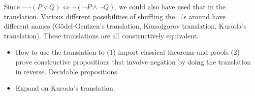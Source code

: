 \documentclass[a4paper, 11pt]{article}
\theoremstyle{definition}
\newcommand{\nn}{\neg \neg}
\begin{document}
Since $\nn (P \vee Q) \iff \neg (\neg P \wedge \neg Q)$, we could also have used that in the translation. Various different possibilities of shuffling the $\neg$'s around have different names (Gödel-Gentzen's translation, Komolgorov translation, Kuroda's translation). These translations are all constructively equivalent.

\begin{itemize}
  \item How to use the translation to (1) import classical theorems and proofs (2) prove constructive propositions that involve negation by doing the translation in reverse. Decidable propositions.
  \item Expand on Kuroda's translation.
\end{itemize}
\end{document}
